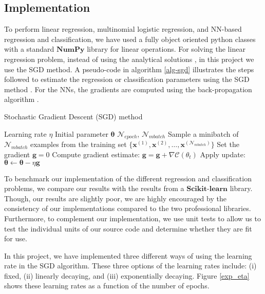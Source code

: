 \documentclass[a4paper]{article}
\begin{document}
\subsection{Implementation}
To perform linear regression, multinomial logistic regression, and NN-based regression and classification, we have used a fully object oriented python classes with a standard $\mathbf{NumPy}$ library for linear operations. For solving the linear regression problem, instead of using the analytical solutions \cite{Jing2020}, in this project we use the SGD method. A pseudo-code in algorithm \ref{alg-sgd} illustrates the steps followed to estimate the regression or classification parameters using the SGD method \cite{GoodBengCour16}. For the NNs, the gradients are computed using the back-propagation algorithm \cite{nielsenneural}.
\begin{algorithm}[H]
    \caption{Stochastic Gradient Descent (SGD) method}
    \label{alg-sgd}
    \begin{algorithmic}[1]
        \Require Learning rate $\eta$
        \Require Initial parameter $\mathbf{\theta}$
        \Require $\mathcal{N}_{epoch}$, $\mathcal{N}_{mbatch}$
            \State Sample a minibatch of $\mathcal{N}_{mbatch}$ examples from the training set $\{\mathbf{x}^{(1)},\mathbf{x}^{(2)},\dots,\mathbf{x}^{(\mathcal{N}_{mbatch})}\}$
            \State Set the gradient $\mathbf{g} = 0$
            \State Compute gradient estimate: $\mathbf{g} = \mathbf{g} + \nabla \mathcal{C}(\theta_t)$
            \EndFor
            \State Apply update: $\mathbf{\theta} \leftarrow \mathbf{\theta} -\eta \mathbf{g}$ 
        \EndFor
    \end{algorithmic}
\end{algorithm}
To benchmark our implementation of the different regression and classification problems, we compare our results with the results from a $\mathbf{Scikit}$-$\mathbf{learn}$ library. Though, our results are slightly poor, we are highly encouraged by the consistency of our implementations compared to the two professional libraries. Furthermore, to complement our implementation, we use unit tests to allow us to test the individual units of our source code and determine whether they are fit for use.  

In this project, we have implemented three different ways of using the learning rate in the SGD algorithm. These three options of the learning rates include: (i) fixed, (ii) linearly decaying, and (iii) exponentially decaying. Figure \ref{exp_eta} shows these learning rates as a function of the number of epochs.
\end{document}
